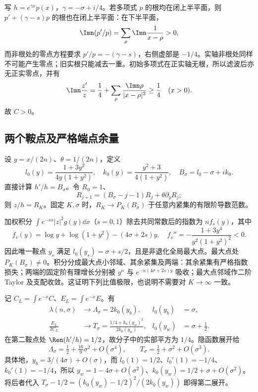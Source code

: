 写 $h=e^{\gamma x}p(x)$，$\gamma=-\sigma+i/4$。若多项式 $p$ 的根均在闭上半平面，则 $p'+(\gamma-s)p$ 的根也在闭上半平面：在下半平面，
\[
\Imn(p'/p)=\sum_\rho\Imn\frac1{x-\rho}>0,
\]
而非根处的零点方程要求 $p'/p=-(\gamma-s)$，右侧虚部是 $-1/4$。实轴非根处同样不可能产生零点；旧实根只能减去一重。初始多项式在正实轴无根，所以滤波后亦无正实零点，并有
\begin{equation}\label{eq:phase-positive}
\Imn\frac{z'}z=\frac14+\sum_\rho\frac{\Imn\rho}{|x-\rho|^2}\ge\frac14
\quad(x>0).
\end{equation}
故 $C>0$。

\subsection{两个鞍点及严格端点余量}
设 $y=x/(2n)$、$\theta=1/(2n)$，定义
\begin{equation}\label{eq:lk}
l_0(y)=\frac{1+3y^2}{4y(1+y^2)},\quad
k_0(y)=\frac{y^2+3}{4(1+y^2)},\quad B_\sigma=l_0-\sigma+ik_0.
\end{equation}
直接计算 $h'/h=B_\sigma$。令 $R_0=1$、
\begin{equation}\label{eq:Rrec}
R_{j+1}=(B_\sigma-j-1)R_j+\theta\partial_yR_j;
\end{equation}
则 $z/h=R_K$。固定 $K,\sigma$ 时，$R_K\to P_K(B_\sigma)$ 于任意内紧集的有限阶导数范数。

加权积分 $\int e^{-sx}|z|^2g(y)\dd x$（$s=0,1$）除去共同常数后的指数为 $nf_s(y)$，其中
\[
f_s(y)=\log y+\log(1+y^2)-(4\sigma+2s)y,
\quad f_s''=-\frac{1+3y^4}{y^2(1+y^2)^2}<0.
\]
因此唯一鞍点 $y_s$ 满足 $l_0(y_s)=\sigma+s/2$，且是非退化全局最大点。最大点处 $P_K(B_\sigma)\ne0$。积分分成最大点小邻域、其余紧集及两端：其余紧集有严格指数损失；两端的固定阶有理增长分别被 $y^n$ 与 $e^{-n(4\sigma+2s)y}$ 吸收；最大点邻域作二阶 Taylor 及支配收敛。这证明下列比值极限，也说明不需要对 $K\to\infty$ 一致。

记 $C_L=\int e^{-x}C$、$E_L=\int e^{-x}E$。有
\begin{align}
\lambda(n,\sigma)&\longrightarrow\Lambda_\sigma=2k_0(y_b),
&l_0(y_b)&=\sigma,\label{eq:Lambda}\\
\frac{E_L}{2C_L}&\longrightarrow T_\sigma
=\frac{1/4+k_0(y_w)^2}{2k_0(y_w)},
&l_0(y_w)&=\sigma+\tfrac12.\label{eq:Tlimit}
\end{align}
在第二鞍点处 $\Ren(h'/h)=1/2$，故分子中的实部平方为 $1/4$。隐函数展开给
\begin{equation}\label{eq:sigma-expand}
\Lambda_\sigma=\tfrac12+\tfrac{16}{9}\sigma^2+O(\sigma^4),\qquad
T_\sigma=\tfrac12+\sigma^2+O(\sigma^3).
\end{equation}
具体地，$y_b=3/(4\sigma)+O(\sigma)$，而 $l_0(1)=1/2$、$l_0'(1)=-1/4$、$k_0'(1)=-1/4$，所以 $y_w=1-4\sigma+O(\sigma^2)$、$k_0(y_w)=1/2+\sigma+O(\sigma^2)$。将后者代入 $T_\sigma-1/2=(k_0(y_w)-1/2)^2/(2k_0(y_w))$ 即得第二展开。

